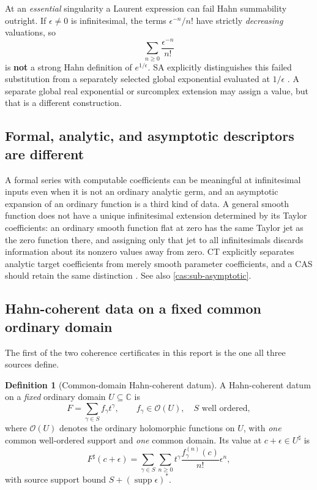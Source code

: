\documentclass[11pt,letterpaper]{article}
\numberwithin{equation}{section}
\theoremstyle{definition}
\newtheorem{definition}[theorem]{Definition}
\theoremstyle{remark}
\newcommand{\C}{\mathbb C}
\newcommand{\OO}{\mathcal O}
\newcommand{\supp}{\operatorname{supp}}
\newcommand{\sh}{^{\sharp}}
\begin{document}
At an \emph{essential} singularity a Laurent expression can fail Hahn
summability outright. If $\epsilon\ne0$ is infinitesimal, the terms
$\epsilon^{-n}/n!$ have strictly \emph{decreasing} valuations, so
\[
 \sum_{n\ge0}\frac{\epsilon^{-n}}{n!}
\]
is \textbf{not} a strong Hahn definition of $e^{1/\epsilon}$. SA explicitly
distinguishes this failed substitution from a separately selected global
exponential evaluated at $1/\epsilon$
\cite{cas:SourceAnalysisTwo,cas:SourceAnalysisThree}. A separate global real
exponential or surcomplex extension may assign a value, but that is a different
construction.

\subsection{Formal, analytic, and asymptotic descriptors are different}
\label{cas:sub-descriptors}
A formal series with computable coefficients can be meaningful at infinitesimal
inputs even when it is not an ordinary analytic germ, and an asymptotic
expansion of an ordinary function is a third kind of data. A general smooth
function does not have a unique infinitesimal extension determined by its Taylor
coefficients: an ordinary smooth function flat at zero has the same Taylor jet
as the zero function there, and assigning only that jet to all infinitesimals
discards information about its nonzero values away from zero. CT explicitly
separates analytic target coefficients from merely smooth parameter
coefficients, and a CAS should retain the same distinction
\cite{cas:SourceCT}. See also \cref{cas:sub-asymptotic}.

\subsection{Hahn-coherent data on a fixed common ordinary domain}
\label{cas:sub-coherent}
The first of the two coherence certificates in this report is the one all three
sources define.

\begin{definition}[Common-domain Hahn-coherent datum]\label{cas:def-coherent}
A Hahn-coherent datum on a \emph{fixed} ordinary domain $U\subseteq\C$ is
\begin{equation}\label{cas:eq-coherent}
 F=\sum_{\gamma\in S}f_\gamma t^\gamma,\qquad
 f_\gamma\in\OO(U),\quad S\text{ well ordered},
\end{equation}
where $\OO(U)$ denotes the ordinary holomorphic functions on $U$, with
\emph{one} common well-ordered support and \emph{one} common domain. Its value
at $c+\epsilon\in U\sh$ is
\begin{equation}\label{cas:eq-coherenteval}
 F\sh(c+\epsilon)=\sum_{\gamma\in S}\sum_{n\ge0}
 t^\gamma\frac{f_\gamma^{(n)}(c)}{n!}\epsilon^n ,
\end{equation}
with source support bound $S+(\supp\epsilon)^*$.
\end{definition}
\end{document}
